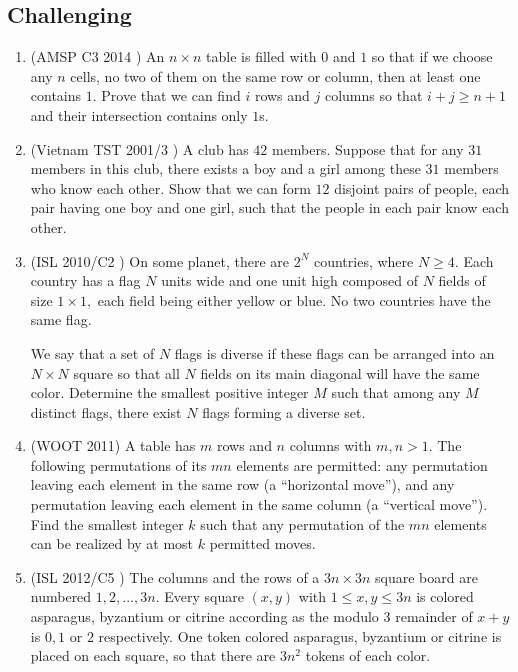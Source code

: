 \documentclass[11pt,paper=letter]{scrartcl}
\begin{document}
\subsection{Challenging}

\begin{enumerate}

\item (AMSP C3 2014 \cite{amsp}) An $n \times n$ table is filled with $0$ and $1$ so that if we choose any $n$ cells, no two of them on the same row or column, then at least one contains $1$. Prove that we can find $i$ rows and $j$ columns so that $i + j \geq n + 1$ and their intersection contains only $1$s. 

\item (Vietnam TST 2001/3 \cite{vietnam}) A club has $42$ members. Suppose that for any $31$ members in this club, there exists a boy and a girl among these $31$ members who know each other. Show that we can form $12$ disjoint pairs of people, each pair having one boy and one girl, such that the people in each pair know each other.

\item (ISL 2010/C2 \cite{islc2}) On some planet, there are $2^N$ countries, where $N\ge4$. Each country has a flag $N$ units wide and one unit high composed of $N$ fields of size $1 \times 1,$ each field being either yellow or blue. No two countries have the same flag.

We say that a set of $N$ flags is diverse if these flags can be arranged into an $N \times N$ square so that all $N$ fields on its main diagonal will have the same color. Determine the smallest positive integer $M$ such that among any $M$ distinct flags, there exist $N$ flags forming a diverse set.

\item (WOOT 2011) A table has $m$ rows and $n$ columns with $m, n > 1$. The following permutations of its $mn$ elements are permitted: any permutation leaving each element in the same row (a ``horizontal move''), and any permutation leaving each element in the same column (a ``vertical move''). Find the smallest integer $k$ such that any permutation of the $mn$ elements can be realized by at most $k$ permitted moves.

\item (ISL 2012/C5 \cite{islc5}) The columns and the rows of a $3n \times 3n$ square board are numbered $1,2,...,3n$. Every square $(x,y)$ with $1 \leq x,y \leq 3n$ is colored asparagus, byzantium or citrine according as the modulo $3$ remainder of $x+y$ is $0, 1$ or $2$ respectively. One token colored asparagus, byzantium or citrine is placed on each square, so that there are $3n^2$ tokens of each color.


\end{enumerate}
\end{document}
